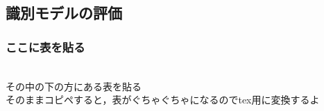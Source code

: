 \subsection{識別モデルの評価}
\subsubsection{ここに表を貼る}
\\
その中の下の方にある表を貼る\\
そのままコピペすると，表がぐちゃぐちゃになるのでtex用に変換するよ\\
